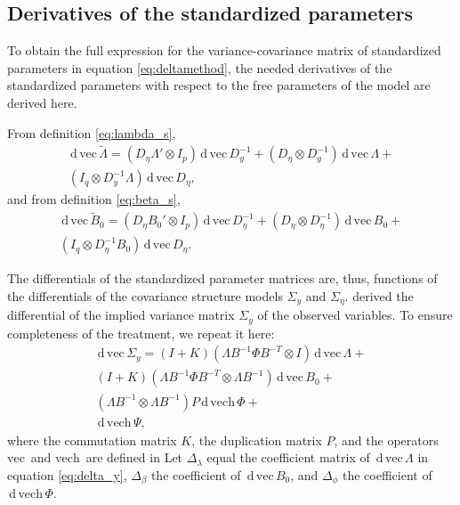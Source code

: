 \documentclass[a4paper, 11pt]{article}
\newcommand{\n}{\eta}
\renewcommand{\l}{\lambda}
\renewcommand{\b}{\beta}
\newcommand{\p}{\phi}
\renewcommand{\d}{\,\mathrm{d}\,}
\newcommand{\kronprod}{\otimes}
\renewcommand{\vec}{\mathrm{vec}\,}
\newcommand{\vech}{\mathrm{vech}\,}
\newcommand{\Lambdastan}{\tilde{\Lambda}}
\newcommand{\Bstan}{\tilde{B}}
\newcommand{\0}{\boldsymbol{0}}
\begin{document}
\subsection{Derivatives of the standardized parameters}

To obtain the full expression for the variance-covariance matrix of
standardized parameters in equation \ref{eq:deltamethod}, the needed
derivatives of the standardized parameters with respect to the free parameters
of the model are derived here.

From definition \ref{eq:lambda_s}, 
\begin{multline}\label{eq:dveclam}
\d\vec\Lambdastan = 
    (D_\n \Lambda' \kronprod I_p) \d \vec D_y^{-1} + 
    (D_\n \kronprod D_y^{-1}) \d\vec\Lambda + \\
    (I_q \kronprod D_y^{-1} \Lambda) \d\vec D_\n,
\end{multline}
and from definition \ref{eq:beta_s}, 
\begin{multline}\label{eq:dvecbeta}
\d\vec \Bstan_0 = 
    (D_\n B_0' \kronprod I_p) \d \vec D_\n^{-1} + 
    (D_\n \kronprod D_\n^{-1}) \d\vec B_0 + \\
    (I_q \kronprod D_\n^{-1} B_0) \d\vec D_\n.
\end{multline}

The differentials of the standardized parameter matrices are, thus, 
functions of the differentials of the covariance structure models $\Sigma_y$
and
$\Sigma_\n$.
\cite{neudecker1991linear} derived the differential of the implied variance
matrix $\Sigma_y$ of the observed variables. To ensure completeness of the treatment, we repeat it here:
\begin{equation}\label{eq:delta_y}
\begin{split}
\d\vec \Sigma_y = (I + K) (\Lambda B^{-1} \Phi B^{-T} \kronprod I) 
\d\vec\Lambda 
+ \\
(I + K) (\Lambda B^{-1} \Phi B^{-T} \kronprod \Lambda B^{-1}) \d\vec B_0
+ \\
(\Lambda B^{-1} \kronprod \Lambda B^{-1}) P \d \vech \Phi
+ \\
\d \vech \Psi,
\end{split}
\end{equation}
where the commutation matrix $K$, the duplication matrix $P$, and the operators
$\vec$ and $\vech$ are defined in \cite{magnus1988matrix}
Let $\Delta_\l$ equal the coefficient matrix
 of $\d\vec\Lambda$ in equation \ref{eq:delta_y}, 
$\Delta_\b$ the coefficient  of $\d\vec B_0$, and
$\Delta_\p$ the coefficient  of $\d\vech\Phi$.
\end{document}
